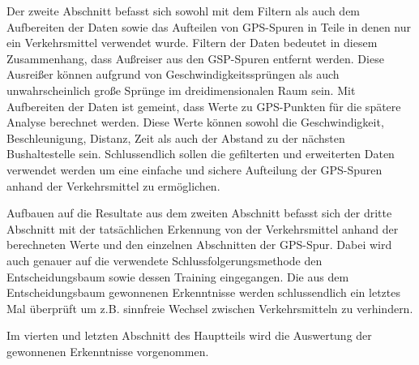 Der zweite Abschnitt befasst sich sowohl mit dem Filtern als auch dem Aufbereiten der Daten sowie das Aufteilen von GPS-Spuren in Teile in denen nur ein Verkehrsmittel verwendet wurde. Filtern der Daten bedeutet in diesem Zusammenhang, dass Außreiser aus den GSP-Spuren entfernt werden. Diese Ausreißer können aufgrund von Geschwindigkeitssprüngen als auch unwahrscheinlich große Sprünge im dreidimensionalen Raum sein. Mit Aufbereiten der Daten ist gemeint, dass Werte zu GPS-Punkten für die spätere Analyse berechnet werden. Diese Werte können sowohl die Geschwindigkeit, Beschleunigung, Distanz, Zeit als auch der Abstand zu der nächsten Bushaltestelle sein. Schlussendlich sollen die gefilterten und erweiterten Daten verwendet werden um eine einfache und sichere Aufteilung der GPS-Spuren anhand der Verkehrsmittel zu ermöglichen.

Aufbauen auf die Resultate aus dem zweiten Abschnitt befasst sich der dritte Abschnitt mit der tatsächlichen Erkennung von der Verkehrsmittel anhand der berechneten Werte und den einzelnen Abschnitten der GPS-Spur. Dabei wird auch genauer auf die verwendete Schlussfolgerungsmethode den Entscheidungsbaum sowie dessen Training eingegangen. Die aus dem Entscheidungsbaum gewonnenen Erkenntnisse werden schlussendlich ein letztes Mal überprüft um z.B. sinnfreie Wechsel zwischen Verkehrsmitteln zu verhindern.

Im vierten und letzten Abschnitt des Hauptteils wird die Auswertung der gewonnenen Erkenntnisse vorgenommen. 
